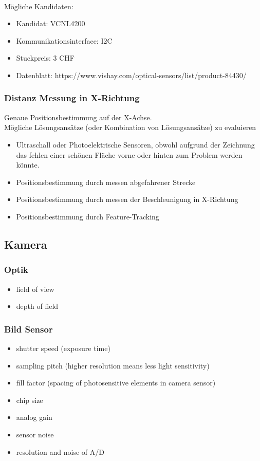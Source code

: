 \documentclass[a4paper]{report}
\begin{document}
\paragraph{} Mögliche Kandidaten:
\begin{itemize}
\item Kandidat: VCNL4200
\item Kommunikationsinterface: I2C
\item Stuckpreis: 3 CHF
\item Datenblatt: https://www.vishay.com/optical-sensors/list/product-84430/
\end{itemize}

\subsubsection{Distanz Messung in X-Richtung}
Genaue Positionsbestimmung auf der X-Achse.\\
Mögliche Lösungsansätze (oder Kombination von Lösungsansätze) zu
evaluieren
\begin{itemize}
\item Ultraschall oder Photoelektrische Sensoren, obwohl aufgrund der Zeichnung das fehlen einer schönen Fläche vorne oder hinten zum Problem werden könnte.
\item Positionsbestimmung durch messen abgefahrener Strecke
\item Positionsbestimmung durch messen der Beschleunigung in X-Richtung
\item Positionsbestimmung durch Feature-Tracking
\end{itemize}

\subsection{Kamera}

\subsubsection{Optik}
\begin{itemize}
\item field of view
\item depth of field
\end{itemize}

\subsubsection{Bild Sensor}
\begin{itemize}
\item shutter speed (exposure time)
\item sampling pitch (higher resolution means less light sensitivity)
\item fill factor (spacing of photosensitive elements in camera sensor)
\item chip size
\item analog gain
\item sensor noise
\item resolution and noise of A/D
\end{itemize}
\end{document}

